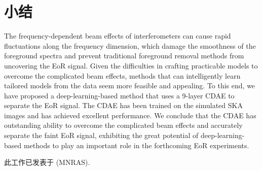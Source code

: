 \section{小结}

The frequency-dependent beam effects of interferometers can cause
rapid fluctuations along the frequency dimension,
which damage the smoothness of the foreground spectra and prevent
traditional foreground removal methods from uncovering the EoR signal.
Given the difficulties in crafting practicable models to overcome the
complicated beam effects, methods that can intelligently learn tailored
models from the data seem more feasible and appealing.
To this end, we have proposed a deep-learning-based method that uses
a 9-layer CDAE to separate the EoR signal.
The CDAE has been trained on the simulated SKA images and has achieved
excellent performance.
We conclude that the CDAE has outstanding ability to overcome the
complicated beam effects and accurately separate the faint EoR signal,
exhibiting the great potential of deep-learning-based methods
to play an important role in the forthcoming EoR experiments.

此工作已发表于 \mnras{} (MNRAS).


